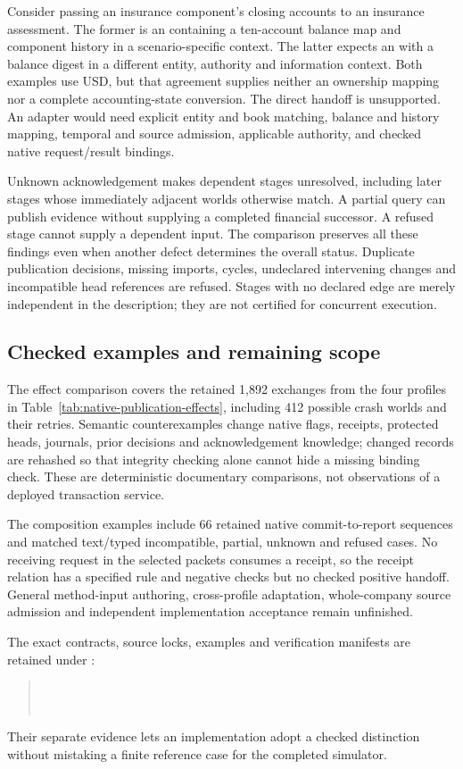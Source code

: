 Consider passing an insurance component's closing accounts to an insurance
assessment. The former is an  containing a ten-account balance
map and component history in a scenario-specific context. The latter expects
an  with a balance digest in a different entity, authority
and information context. Both examples use USD, but that agreement supplies
neither an ownership mapping nor a complete accounting-state conversion. The
direct handoff is unsupported. An adapter would need explicit entity and book
matching, balance and history mapping, temporal and source admission, applicable
authority, and checked native request/result bindings.

Unknown acknowledgement makes dependent stages unresolved, including later
stages whose immediately adjacent worlds otherwise match. A partial query can
publish evidence without supplying a completed financial successor. A refused
stage cannot supply a dependent input. The comparison preserves all these
findings even when another defect determines the overall status. Duplicate
publication decisions, missing imports, cycles, undeclared intervening changes
and incompatible head references are refused. Stages with no declared edge are
merely independent in the description; they are not certified for concurrent
execution.

\subsection{Checked examples and remaining scope}

The effect comparison covers the retained 1,892 exchanges from the four profiles
in Table~\ref{tab:native-publication-effects}, including 412 possible crash worlds
and their retries. Semantic counterexamples change native flags, receipts,
protected heads, journals, prior decisions and acknowledgement knowledge; changed
records are rehashed so that integrity checking alone cannot hide a missing
binding check. These are deterministic documentary comparisons, not observations
of a deployed transaction service.

The composition examples include 66 retained native commit-to-report sequences
and matched text/typed incompatible, partial, unknown and refused cases. No
receiving request in the selected packets consumes a receipt, so the receipt
relation has a specified rule and negative checks but no checked positive
handoff. General method-input authoring, cross-profile adaptation, whole-company
source admission and independent implementation acceptance remain unfinished.

The exact contracts, source locks, examples and verification manifests are
retained under :
\begin{quote}
\small
{}\\
\\
\end{quote}
Their separate evidence lets an implementation adopt a checked distinction
without mistaking a finite reference case for the completed simulator.

